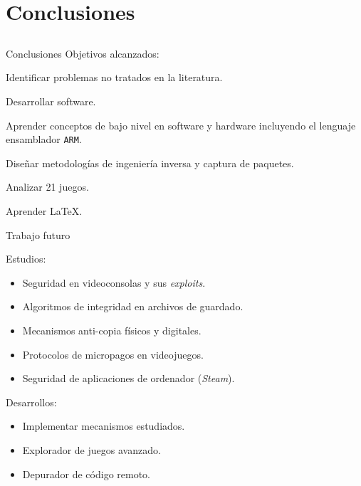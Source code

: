 
\section{Conclusiones}
\subsection{}

\begin{frame}{Conclusiones}
Objetivos alcanzados:
\begin{wideitemize}
    \item<+-> Identificar problemas no tratados en la literatura.

    \item<+-> Desarrollar software.

    \item<+-> Aprender conceptos de bajo nivel en software y hardware incluyendo el lenguaje ensamblador \texttt{ARM}.

    \item<+-> Diseñar metodologías de ingeniería inversa y captura de paquetes.

    \item<+-> Analizar 21 juegos.

    \item<+-> Aprender \LaTeX.
\end{wideitemize}
\end{frame}

\begin{frame}{Trabajo futuro}
\begin{wideitemize}
    \item<+-> Estudios:
    \begin{itemize}
        \item<+-> Seguridad en videoconsolas y sus \textit{exploits}.
        \item<+-> Algoritmos de integridad en archivos de guardado.
        \item<+-> Mecanismos anti-copia físicos y digitales.
        \item<+-> Protocolos de micropagos en videojuegos.
        \item<+-> Seguridad de aplicaciones de ordenador (\textit{Steam}).
    \end{itemize}

    \item<+-> Desarrollos:
    \begin{itemize}
        \item<+-> Implementar mecanismos estudiados.
        \item<+-> Explorador de juegos avanzado.
        \item<+-> Depurador de código remoto.
    \end{itemize}
\end{wideitemize}
\end{frame}
